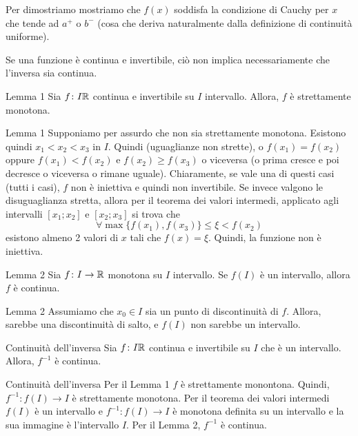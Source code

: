 \documentclass[a4paper]{article}
\begin{document}
Per dimostriamo mostriamo che \(f(x)\) soddisfa la condizione di Cauchy per \(x\) che tende
ad \(a^+\) o \(b^-\) (cosa che deriva naturalmente dalla definizione di continuità uniforme).

Se una funzione è continua e invertibile, ciò non implica necessariamente che l'inversa sia continua.

\begin{snippetlemma}{Lemma 1}
    Sia \(f\colon I \mathbb{R}\) continua e invertibile su \(I\) intervallo.
    Allora, \(f\) è strettamente monotona.
\end{snippetlemma}

\begin{snippetproof}{Lemma 1}
    Supponiamo per assurdo che non sia strettamente monotona.
    Esistono quindi \(x_1 < x_2 < x_3\) in \(I\).
    Quindi (uguaglianze non strette), o \(f(x_1) = f(x_2)\) oppure \(f(x_1) < f(x_2)\) e \(f(x_2) \geq f(x_3)\) o viceversa
    (o prima cresce e poi decresce o viceversa o rimane uguale).
    Chiaramente, se vale una di questi casi (tutti i casi), \(f\) non è iniettiva e quindi non invertibile.
    Se invece valgono le disuguaglianza stretta, allora per il teorema dei valori intermedi,
    applicato agli intervalli \([x_1; x_2]\) e \([x_2; x_3]\) si trova che
    \[
        \forall \max\{f(x_1), f(x_3)\} \leq \xi < f(x_2)
    \]
    esistono almeno 2 valori di \(x\) tali che \(f(x) = \xi\). Quindi, la funzione non è iniettiva.
\end{snippetproof}

\begin{snippetlemma}{Lemma 2}
    Sia \(f\colon I \to \mathbb{R}\) monotona su \(I\) intervallo.
    Se \(f(I)\) è un intervallo, allora \(f\) è continua.
\end{snippetlemma}

\begin{snippetproof}{Lemma 2}
    Assumiamo che \(x_0\in I\) sia un punto di discontinuità di \(f\).
    Allora, sarebbe una discontinuità di salto, e \(f(I)\) non sarebbe un intervallo.
\end{snippetproof}

\begin{snippettheorem}{Continuità dell'inversa}
    Sia \(f\colon I \mathbb{R}\) continua e invertibile su \(I\) che è un intervallo.
    Allora, \(f^{-1}\) è continua.
\end{snippettheorem}

\begin{snippetproof}{Continuità dell'inversa}
    Per il Lemma 1 \(f\) è strettamente monontona. Quindi, \(f^{-1} \colon f(I) \to I\) è strettamente monotona.
    Per il teorema dei valori intermedi \(f(I)\) è un intervallo e \(f^{-1}\colon f(I)\to I\) è monotona definita su un intervallo
    e la sua immagine è l'intervallo \(I\). Per il Lemma 2, \(f^{-1}\) è continua.
\end{snippetproof}
\end{document}
